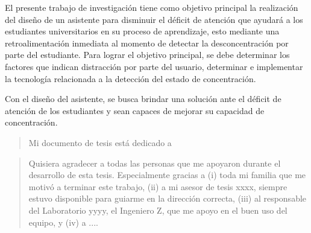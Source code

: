 \hspace{1cm}El presente trabajo de investigación tiene como objetivo principal la realización del diseño de un asistente para disminuir el déficit de atención que ayudará a los estudiantes universitarios en su proceso de aprendizaje, esto mediante una retroalimentación inmediata al momento de detectar la desconcentración por parte del estudiante. Para lograr el objetivo principal, se debe determinar los factores que indican distracción por parte del usuario, determinar e implementar la tecnología relacionada a la detección del estado de concentración.

Con el diseño del asistente, se busca brindar una solución ante el déficit de atención de los estudiantes y sean capaces de mejorar su capacidad de concentración.
 

\clearpage
\begin{quote}
\hspace{1cm}Mi documento de tesis está dedicado a \lipsum[1]
\end{quote}
\begin{quote}
\hspace{1cm}Quisiera agradecer a todas las personas que me apoyaron durante el desarrollo de esta tesis. Especialmente gracias a (i) toda mi familia que me motivó a terminar este trabajo, (ii) a mi asesor de tesis xxxx, siempre estuvo disponible para guiarme en la dirección correcta, (iii) al responsable del Laboratorio yyyy, el Ingeniero Z, que me apoyo en el buen uso del equipo, y (iv) a ....
\end{quote}